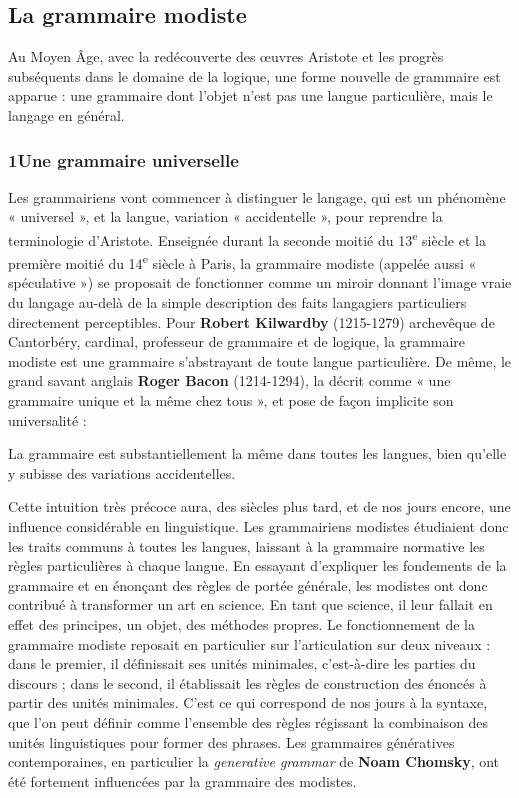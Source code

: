 \subsection{La grammaire modiste}
Au Moyen Âge, avec la redécouverte des œuvres Aristote et les progrès subséquents dans le domaine de la logique, une forme nouvelle de grammaire est apparue : une grammaire dont l’objet n’est pas une langue particulière, mais le langage en général.
\subsubsection*{1\quad Une grammaire universelle}
Les grammairiens vont commencer à distinguer le langage, qui est un phénomène « universel », et la langue, variation « accidentelle », pour reprendre la terminologie d’Aristote. Enseignée durant la seconde moitié du 13\textsuperscript{e} siècle et la première moitié du 14\textsuperscript{e} siècle à Paris, la grammaire modiste (appelée aussi « spéculative ») se proposait de fonctionner comme un miroir donnant l’image vraie du langage au-delà de la simple description des faits langagiers particuliers directement perceptibles. Pour \textbf{Robert Kilwardby} (1215-1279) archevêque de Cantorbéry, cardinal, professeur de grammaire et de logique, la grammaire modiste est une grammaire s’abstrayant de toute langue particulière. De même, le grand savant anglais \textbf{Roger Bacon} (1214-1294), la décrit comme « une grammaire unique et la même chez tous », et pose de façon implicite son universalité :
\begin{lecture}{}
La grammaire est substantiellement la même dans toutes les langues, bien qu’elle y subisse des variations accidentelles.
\end{lecture}
Cette intuition très précoce aura, des siècles plus tard, et de nos jours encore, une influence considérable en linguistique. Les grammairiens modistes étudiaient donc les traits communs à toutes les langues, laissant à la grammaire normative les règles particulières à chaque langue. En essayant d’expliquer les fondements de la grammaire et en énonçant des règles de portée générale, les modistes ont donc contribué à transformer un art en science. En tant que science, il leur fallait en effet des principes, un objet, des méthodes propres. Le fonctionnement de la grammaire modiste reposait en particulier sur l’articulation sur deux niveaux : dans le premier, il définissait ses unités minimales, c’est-à-dire les parties du discours ; dans le second, il établissait les règles de construction des énoncés à partir des unités minimales. C’est ce qui correspond de nos jours à la syntaxe, que l’on peut définir comme l’ensemble des règles régissant la combinaison des unités linguistiques pour former des phrases. Les grammaires génératives contemporaines, en particulier la \textit{generative grammar} de \textbf{Noam Chomsky}, ont été fortement influencées par la grammaire des modistes.
